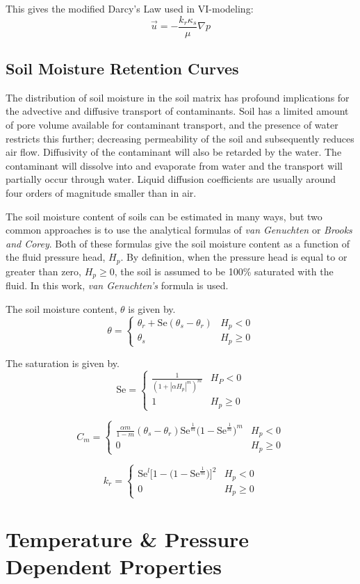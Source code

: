 \documentclass[../main.tex]{subfiles}
\begin{document}
This gives the modified Darcy's Law used in VI-modeling:
\begin{equation}\label{eq:darcys_law}
  \vec{u} = -\frac{k_r \kappa_s}{\mu}\nabla p
\end{equation}


\subsection{Soil Moisture Retention Curves}

The distribution of soil moisture in the soil matrix has profound implications for the advective and diffusive transport of contaminants.
Soil has a limited amount of pore volume available for contaminant transport, and the presence of water restricts this further; decreasing permeability of the soil and subsequently reduces air flow.
Diffusivity of the contaminant will also be retarded by the water.
The contaminant will dissolve into and evaporate from water and the transport will partially occur through water.
Liquid diffusion coefficients are usually around four orders of magnitude smaller than in air.

The soil moisture content of soils can be estimated in many ways, but two common approaches is to use the analytical formulas of \textit{van Genuchten} or \textit{Brooks and Corey}.
Both of these formulas give the soil moisture content as a function of the fluid pressure head, $H_p$.
By definition, when the pressure head is equal to or greater than zero, $H_p \geq 0$, the soil is assumed to be 100\% saturated with the fluid.
In this work, \textit{van Genuchten's} formula is used.

The soil moisture content, $\theta$ is given by.
\begin{equation}
  \theta = \begin{cases}
    \theta_r + \mathrm{Se}(\theta_s - \theta_r) & H_p < 0 \\
    \theta_s & H_p \geq 0
\end{cases}
\end{equation}

The saturation is given by.
\begin{equation}
  \mathrm{Se} = \begin{cases}
    \frac{1}{(1 + |\alpha H_p|^m)^m} & H_P < 0 \\
    1 & H_p \geq 0
  \end{cases}
\end{equation}

\begin{equation}
  C_m = \begin{cases}
    \frac{\alpha m}{1-m}(\theta_s - \theta_r)\mathrm{Se}^{\frac{1}{m}}\big( 1 - \mathrm{Se}^{\frac{1}{m}} \big)^m & H_p < 0 \\
    0 & H_p \geq 0
  \end{cases}
\end{equation}

\begin{equation}
  k_r = \begin{cases}
    \mathrm{Se}^l \big[ 1 - \big( 1 - \mathrm{Se}^\frac{1}{m} \big) \big]^2 & H_p < 0 \\
    0 & H_p \geq 0
  \end{cases}
\end{equation}

\section{Temperature \& Pressure Dependent Properties}
\end{document}
